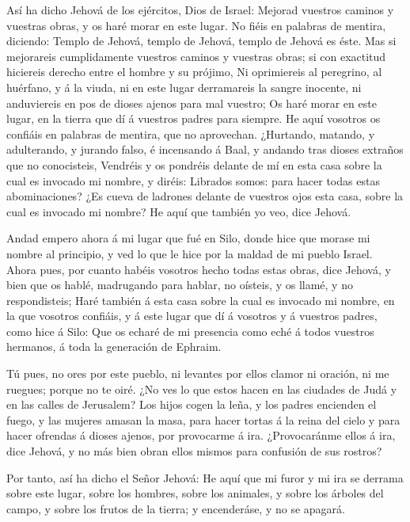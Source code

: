  Así ha dicho Jehová de los ejércitos, Dios de Israel:
Mejorad vuestros caminos y vuestras obras, y os haré morar en este
lugar.  No fiéis en palabras de mentira, diciendo: Templo de
Jehová, templo de Jehová, templo de Jehová es éste.  Mas si
mejorareis cumplidamente vuestros caminos y vuestras obras; si con
exactitud hiciereis derecho entre el hombre y su prójimo, 
Ni oprimiereis al peregrino, al huérfano, y á la viuda, ni en este lugar
derramareis la sangre inocente, ni anduviereis en pos de dioses ajenos
para mal vuestro;  Os haré morar en este lugar, en la tierra
que dí á vuestros padres para siempre.  He aquí vosotros os
confiáis en palabras de mentira, que no aprovechan. 
¿Hurtando, matando, y adulterando, y jurando falso, é incensando á Baal,
y andando tras dioses extraños que no conocisteis, 
Vendréis y os pondréis delante de mí en esta casa sobre la cual es
invocado mi nombre, y diréis: Librados somos: para hacer todas estas
abominaciones?  ¿Es cueva de ladrones delante de vuestros
ojos esta casa, sobre la cual es invocado mi nombre? He aquí que también
yo veo, dice Jehová.

 Andad empero ahora á mi lugar que fué en Silo, donde hice
que morase mi nombre al principio, y ved lo que le hice por la maldad de
mi pueblo Israel.  Ahora pues, por cuanto habéis vosotros
hecho todas estas obras, dice Jehová, y bien que os hablé, madrugando
para hablar, no oísteis, y os llamé, y no respondisteis; 
Haré también á esta casa sobre la cual es invocado mi nombre, en la que
vosotros confiáis, y á este lugar que dí á vosotros y á vuestros padres,
como hice á Silo:  Que os echaré de mi presencia como eché
á todos vuestros hermanos, á toda la generación de Ephraim.

 Tú pues, no ores por este pueblo, ni levantes por ellos
clamor ni oración, ni me ruegues; porque no te oiré.  ¿No
ves lo que estos hacen en las ciudades de Judá y en las calles de
Jerusalem?  Los hijos cogen la leña, y los padres encienden
el fuego, y las mujeres amasan la masa, para hacer tortas á la reina del
cielo y para hacer ofrendas á dioses ajenos, por provocarme á ira.
 ¿Provocaránme ellos á ira, dice Jehová, y no más bien
obran ellos mismos para confusión de sus rostros?

 Por tanto, así ha dicho el Señor Jehová: He aquí que mi
furor y mi ira se derrama sobre este lugar, sobre los hombres, sobre los
animales, y sobre los árboles del campo, y sobre los frutos de la
tierra; y encenderáse, y no se apagará.

